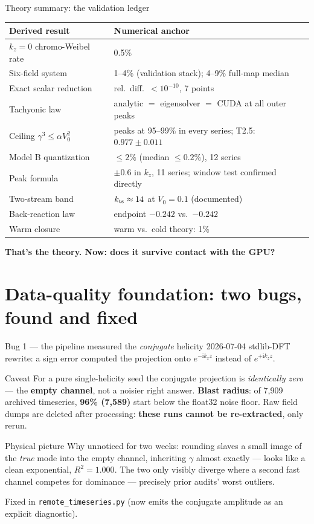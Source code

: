 \documentclass[aspectratio=169,11pt]{beamer}
\newenvironment{physpicture}{\begin{exampleblock}{Physical picture}}{\end{exampleblock}}
\newenvironment{caveat}{\begin{alertblock}{Caveat}}{\end{alertblock}}
\newcommand{\Vo}{V_0}
\newcommand{\kz}{k_z}
\newcommand{\ii}{\mathrm{i}}
\begin{document}
\begin{frame}{Theory summary: the validation ledger}
\footnotesize
\begin{tabular}{p{}p{}}
\toprule
Derived result & Numerical anchor\\\midrule
$\kz{=}0$ chromo-Weibel rate & 0.5\%\\
Six-field system & 1--4\% (validation stack); 4--9\% full-map median\\
Exact scalar reduction & rel.\ diff.\ $<10^{-10}$, 7 points\\
Tachyonic law & analytic $=$ eigensolver $=$ CUDA at all outer peaks\\
Ceiling $\gamma^3\le\alpha\Vo^2$ & peaks at 95--99\% in every series; T2.5: $0.977\pm0.011$\\
Model B quantization & $\le2\%$ (median $\le0.2\%$), 12 series\\
Peak formula & $\pm0.6$ in $\kz$, 11 series; window test confirmed directly\\
Two-stream band & $k_{\rm ts}\approx14$ at $\Vo=0.1$ (documented)\\
Back-reaction law & endpoint $-0.242$ vs.\ $-0.242$\\
Warm closure & warm vs.\ cold theory: 1\%\\
\bottomrule
\end{tabular}
\vspace{0.1em}
\centering\textbf{That's the theory. Now: does it survive contact with the GPU?}
\end{frame}

\section{Data-quality foundation: two bugs, found and fixed}

\begin{frame}{Bug 1 --- the pipeline measured the \emph{conjugate} helicity}
\footnotesize
2026-07-04 stdlib-DFT rewrite: a sign error computed the projection onto
$e^{-\ii\kz z}$ instead of $e^{+\ii\kz z}$.
\begin{caveat}
For a pure single-helicity seed the conjugate projection is \emph{identically
zero} — the \textbf{empty channel}, not a noisier right answer.
\textbf{Blast radius}: of 7{,}909 archived timeseries, \textbf{96\% (7{,}589)}
start below the float32 noise floor. Raw field dumps are deleted after
processing: \textbf{these runs cannot be re-extracted}, only rerun.
\end{caveat}
\begin{physpicture}
Why unnoticed for two weeks: rounding slaves a small image of the \emph{true}
mode into the empty channel, inheriting $\gamma$ almost exactly — looks like a
clean exponential, $R^2=1.000$. The two only visibly diverge where a second
fast channel competes for dominance — precisely prior audits' worst outliers.
\end{physpicture}
Fixed in \texttt{remote\_timeseries.py} (now emits the conjugate amplitude as an
explicit diagnostic).
\end{frame}
\end{document}
